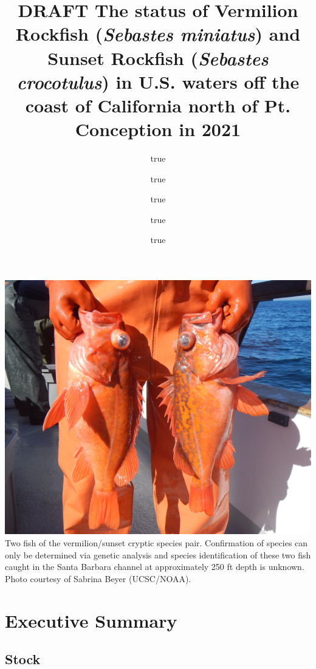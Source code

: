 \documentclass[
  english,
  a4paper,
]{article}
\title{DRAFT The status of Vermilion Rockfish (\emph{Sebastes miniatus}) and Sunset Rockfish (\emph{Sebastes crocotulus}) in U.S. waters off the coast of California north of Pt. Conception in 2021}
\author{true \and true \and true \and true \and true}
\date{}
\begin{document}
\maketitle

{
\setcounter{tocdepth}{2}
\tableofcontents
}
\newcommand\CapeM{$40^\circ 10^\prime N$}
\newcommand\PtC{$34^\circ 27^\prime N$}
\newcommand\CAOR{$42^\circ 00^\prime N$}

\newpage

\includegraphics{cover_photo.png}
Two fish of the vermilion/sunset cryptic species pair. Confirmation of
species can only be determined via genetic analysis and species identification
of these two fish caught in the Santa Barbara channel at approximately 250 ft depth
is unknown. Photo courtesy of Sabrina Beyer (UCSC/NOAA).

\pagebreak
{}
\setcounter{page}{1}

\renewcommand{\thetable}{\roman{table}}
\renewcommand{\thefigure}{\roman{figure}}

\setlength\parskip{0.5em plus 0.1em minus 0.2em}

\hypertarget{executive-summary}{%
\section*{Executive Summary}\label{executive-summary}}

\hypertarget{stock}{%
\subsection*{Stock}\label{stock}}
\end{document}
